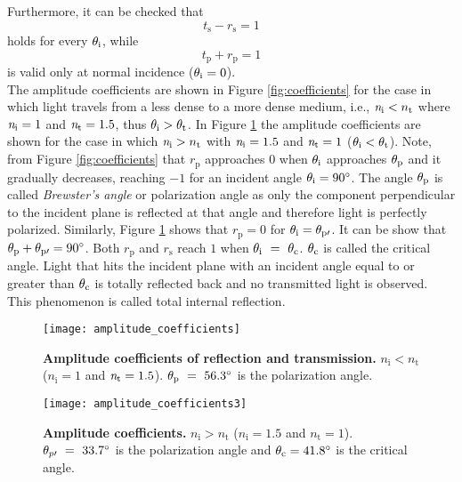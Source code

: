 Furthermore, it can be checked that
 \begin{equation}
t_\textrm{s}-r_\textrm{s} = 1
\end{equation}
holds for every $\theta_{\textrm{i}}$, while 
\begin{equation}
t_\textrm{p}+r_\textrm{p} =  1
\end{equation}
is valid only at normal incidence ($\theta_{\textrm{i}} = 0$).
\\ \indent The amplitude coefficients are shown in Figure \ref{fig:coefficients} for the case in which light travels from a less dense to a more dense medium, i.e., $\textit{n}_\textrm{i}<n_\textrm{t}$ where $\textit{n}_{\textrm{i}}= 1$ and $\textit{n}_{\textrm{t}}=1.5$, thus $\theta_\textrm{i}>\theta_\textrm{t}$. 
In Figure \ref{fig:coefficients2} the amplitude coefficients are shown for the case in which $\textit{n}_\textrm{i}>n_\textrm{t}$ with $\textit{n}_{\textrm{i}}= 1.5$ and $\textit{n}_{\textrm{t}}=1$ ($\theta_\textrm{i}<\theta_\textrm{t}$). Note, from Figure \ref{fig:coefficients} that $r_\textrm{p}$ approaches $0$ when $\theta_\textrm{i}$ approaches $\theta_\textrm{p}$ and it gradually decreases, reaching $-1$ for an incident angle $\theta_\textrm{i}=90^\circ$. The angle $\theta_\textrm{p}$ is called \textit{Brewster's angle} or polarization angle as only the component perpendicular to the incident plane is reflected at that angle and therefore light is perfectly polarized. Similarly, Figure \ref{fig:coefficients2} shows that $r_\textrm{p}=0$ for $\theta_\textrm{i}= \theta_{\textrm{p}\prime}$. It can be show that $\theta_\textrm{p}+ \theta_{\textrm{p}\prime}= 90^\circ$. Both $r_\textrm{p}$ and $r_\textrm{s}$ reach $1$ when $\theta_\textrm{i}~=~\theta_\textrm{c}$. $\theta_\textrm{c}$ is called the critical angle. Light that hits the incident plane with an incident angle equal to or greater than $\theta_{\textrm{c}}$ is totally reflected back and no transmitted light is observed. This phenomenon is called total internal reflection. 
\begin{figure}[t]
  \begin{minipage}[h]{0.48\textwidth}
    \texttt{[image: amplitude\_coefficients]}
    \caption{\textbf{Amplitude coefficients of reflection and transmission.} $n_\textrm{i}<n_\textrm{t}$
($n_\textrm{i} = 1$ and $\textit{n}_\textrm{t}=1.5$). $\theta_\textrm{p} ~=~ 56.3^\circ$ is the polarization angle.}
    \label{fig:coefficients}
  \end{minipage}\hfill
  \begin{minipage}[h]{0.48\textwidth}
    \texttt{[image: amplitude\_coefficients3]}
    \caption{\textbf{Amplitude coefficients.} $n_\textrm{i}>n_\textrm{t}$
($n_\textrm{i} = 1.5$ and $n_\textrm{t}=1$). $\theta_{p\prime}~=~ 33.7^\circ$ is the polarization angle and $\theta_\textrm{c}= 41.8^\circ$ is the critical angle.}
   \label{fig:coefficients2}
 \end{minipage}
\end{figure}\\
